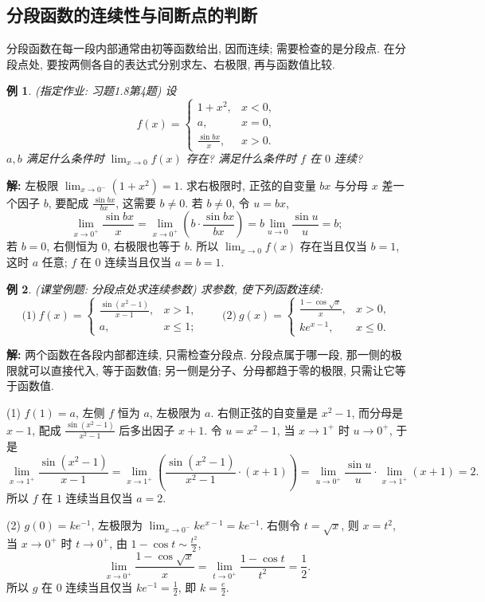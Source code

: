\documentclass[UTF8,openany]{ctexbook}
\theoremstyle{chinesetextbook}
\newtheorem{example}{例}[section]
\newenvironment{cnsolution}{\par\indent\textbf{解:} \ignorespaces}{\par}
\begin{document}
\subsection{分段函数的连续性与间断点的判断}
分段函数在每一段内部通常由初等函数给出, 因而连续; 需要检查的是分段点. 在分段点处, 要按两侧各自的表达式分别求左、右极限, 再与函数值比较.
\begin{example}
\textnormal{(指定作业: 习题1.8第4题)} 设
\[
f(x)=\begin{cases}1+x^2,&x<0,\\a,&x=0,\\\frac{\sin bx}x,&x>0.\end{cases}
\]
$a,b$ 满足什么条件时 $\displaystyle\lim_{x\to0}f(x)$ 存在? 满足什么条件时 $f$ 在 $0$ 连续?
\end{example}
\begin{cnsolution}
左极限 $\displaystyle\lim_{x\to0^-}(1+x^2)=1$. 求右极限时, 正弦的自变量 $bx$ 与分母 $x$ 差一个因子 $b$, 要配成 $\displaystyle\frac{\sin bx}{bx}$, 这需要 $b\ne0$. 若 $b\ne0$, 令 $u=bx$,
\[
\lim_{x\to0^+}\frac{\sin bx}x=\lim_{x\to0^+}\left(b\cdot\frac{\sin bx}{bx}\right)=b\lim_{u\to0}\frac{\sin u}u=b;
\]
若 $b=0$, 右侧恒为 $0$, 右极限也等于 $b$. 所以 $\displaystyle\lim_{x\to0}f(x)$ 存在当且仅当 $b=1$, 这时 $a$ 任意; $f$ 在 $0$ 连续当且仅当 $a=b=1$.
\end{cnsolution}
\begin{example}
\textnormal{(课堂例题: 分段点处求连续参数)} 求参数, 使下列函数连续:
\[
\text{(1)}\ f(x)=\begin{cases}\frac{\sin(x^2-1)}{x-1},&x>1,\\a,&x\le1;\end{cases}\qquad\text{(2)}\ g(x)=\begin{cases}\frac{1-\cos\sqrt x}x,&x>0,\\ke^{x-1},&x\le0.\end{cases}
\]
\end{example}
\begin{cnsolution}
两个函数在各段内部都连续, 只需检查分段点. 分段点属于哪一段, 那一侧的极限就可以直接代入, 等于函数值; 另一侧是分子、分母都趋于零的极限, 只需让它等于函数值.

(1) $f(1)=a$, 左侧 $f$ 恒为 $a$, 左极限为 $a$. 右侧正弦的自变量是 $x^2-1$, 而分母是 $x-1$, 配成 $\displaystyle\frac{\sin(x^2-1)}{x^2-1}$ 后多出因子 $x+1$. 令 $u=x^2-1$, 当 $x\to1^+$ 时 $u\to0^+$, 于是
\[
\lim_{x\to1^+}\frac{\sin(x^2-1)}{x-1}=\lim_{x\to1^+}\left(\frac{\sin(x^2-1)}{x^2-1}\cdot(x+1)\right)=\lim_{u\to0^+}\frac{\sin u}u\cdot\lim_{x\to1^+}(x+1)=2.
\]
所以 $f$ 在 $1$ 连续当且仅当 $a=2$.

(2) $g(0)=ke^{-1}$, 左极限为 $\displaystyle\lim_{x\to0^-}ke^{x-1}=ke^{-1}$. 右侧令 $t=\sqrt x$, 则 $x=t^2$, 当 $x\to0^+$ 时 $t\to0^+$, 由 $\displaystyle1-\cos t\sim\frac{t^2}2$,
\[
\lim_{x\to0^+}\frac{1-\cos\sqrt x}x=\lim_{t\to0^+}\frac{1-\cos t}{t^2}=\frac12.
\]
所以 $g$ 在 $0$ 连续当且仅当 $\displaystyle ke^{-1}=\frac12$, 即 $\displaystyle k=\frac e2$.
\end{cnsolution}
\end{document}

